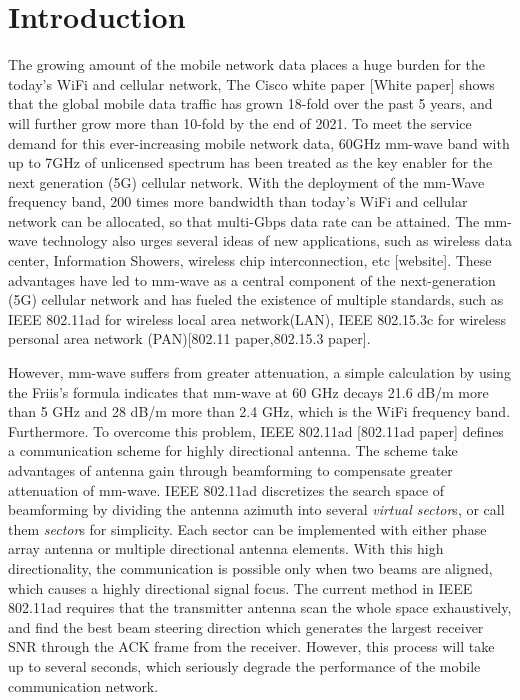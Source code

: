 \documentclass[conference]{IEEEtran}
\begin{document}
\section{Introduction}
The growing amount of the mobile network data places a huge burden for the today's WiFi and cellular network, The Cisco white paper [White paper] shows that the global mobile data traffic has grown 18-fold over the past 5 years, and will further grow more than 10-fold by the end of 2021. To meet the service demand for this ever-increasing mobile network data, 60GHz mm-wave band with up to 7GHz of unlicensed spectrum has been treated as the key enabler for the next generation (5G) cellular network. With the deployment of the mm-Wave frequency band, 200 times more bandwidth than today's WiFi and cellular network can be allocated, so that multi-Gbps data rate can be attained. The mm-wave technology also urges several ideas of new applications, such as wireless data center, Information Showers, wireless chip interconnection, etc [website]. These advantages have led to mm-wave as a central component of the next-generation (5G) cellular network and has fueled the existence of multiple standards, such as IEEE 802.11ad for wireless local area network(LAN), IEEE 802.15.3c for wireless personal area network (PAN)[802.11 paper,802.15.3 paper].   

However, mm-wave suffers from greater attenuation, a simple calculation by using the Friis's formula indicates that mm-wave at 60 GHz decays 21.6 dB/m more than 5 GHz and 28 dB/m more than 2.4 GHz, which is the WiFi frequency band. Furthermore. To overcome this problem, IEEE 802.11ad [802.11ad paper] defines a communication scheme for highly directional antenna. The scheme take advantages of antenna gain through beamforming to compensate greater attenuation of mm-wave. IEEE 802.11ad discretizes the search space of beamforming by dividing the antenna azimuth into several \emph{virtual sector}s, or call them \emph{sector}s for simplicity. Each sector can be implemented with either phase array antenna or multiple directional antenna elements.  With this high directionality, the communication is possible only when two beams are aligned, which causes a highly directional signal focus.  The current method in IEEE 802.11ad requires that the transmitter antenna scan the whole space exhaustively, and find the best beam steering direction which generates the largest receiver SNR through the ACK frame from the receiver. However, this process will take up to several seconds, which seriously degrade the performance of the mobile communication network. 
\end{document}
